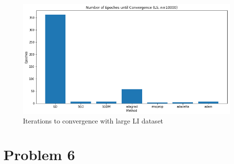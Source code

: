 \documentclass[twoside,11pt]{homework}
\begin{document}
\begin{figure}[H]
		\centering
		\includegraphics[scale=.5]{q5/insep_10000/time.png}
		\caption{Iterations to convergence with large LI dataset}
	\end{figure}



\section*{Problem 6}
\end{document}
